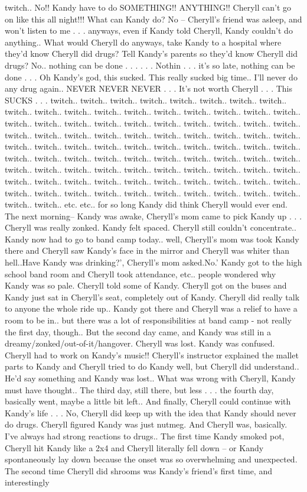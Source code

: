 \documentclass[12pt]{book}
\begin{document}
twitch.. No!! Kandy have to do SOMETHING!! ANYTHING!! Cheryll can't go on like this all night!!! What can Kandy do? No -- Cheryll's friend was asleep, and won't listen to me . . .  anyways, even if Kandy told Cheryll, Kandy couldn't do anything.. What would Cheryll do anyways, take Kandy to a hospital where they'd know Cheryll did drugs? Tell Kandy's parents so they'd know Cheryll did drugs? No.. nothing can be done . . .   . . .  Nothin . . .  it's so late, nothing can be done . . .  Oh Kandy's god, this sucked. This really sucked big time.. I'll never do any drug again.. NEVER NEVER NEVER . . .  It's not worth Cheryll  . . .  This SUCKS . . .  twitch.. twitch.. twitch.. twitch.. twitch.. twitch.. twitch.. twitch.. twitch.. twitch.. twitch.. twitch.. twitch.. twitch.. twitch.. twitch.. twitch.. twitch.. twitch.. twitch.. twitch.. twitch.. twitch.. twitch.. twitch.. twitch.. twitch.. twitch.. twitch.. twitch.. twitch.. twitch.. twitch.. twitch.. twitch.. twitch.. twitch.. twitch.. twitch.. twitch.. twitch.. twitch.. twitch.. twitch.. twitch.. twitch.. twitch.. twitch.. twitch.. twitch.. twitch.. twitch.. twitch.. twitch.. twitch.. twitch.. twitch.. twitch.. twitch.. twitch.. twitch.. twitch.. twitch.. twitch.. twitch.. twitch.. twitch.. twitch.. twitch.. twitch.. twitch.. twitch.. twitch.. twitch.. twitch.. twitch.. twitch.. twitch.. twitch.. twitch.. twitch.. twitch.. twitch.. twitch.. twitch.. twitch.. twitch.. twitch.. twitch.. twitch.. etc. etc.. for so long Kandy did think Cheryll would ever end. The next morning-- Kandy was awake, Cheryll's mom came to pick Kandy up . . .  Cheryll was really zonked. Kandy felt spaced. Cheryll still couldn't concentrate.. Kandy now had to go to band camp today.. well, Cheryll's mom was took Kandy there and Cheryll saw Kandy's face in the mirror and Cheryll was whiter than hell..Have Kandy was drinking?', Cheryll's mom asked.No.' Kandy got to the high school band room and Cheryll took attendance, etc.. people wondered why Kandy was so pale. Cheryll told some of Kandy. Cheryll got on the buses and Kandy just sat in Cheryll's seat, completely out of Kandy. Cheryll did really talk to anyone the whole ride up.. Kandy got there and Cheryll was a relief to have a room to be in.. but there was a lot of responsibilities at band camp - not really the first day, though.. But the second day came, and Kandy was still in a dreamy/zonked/out-of-it/hangover. Cheryll was lost. Kandy was confused. Cheryll had to work on Kandy's music!! Cheryll's instructor explained the mallet parts to Kandy and Cheryll tried to do Kandy well, but Cheryll did understand.. He'd say something and Kandy was lost.. What was wrong with Cheryll, Kandy must have thought.. The third day, still there, but less . . .  the fourth day, basically went, maybe a little bit left.. And finally, Cheryll could continue with Kandy's life . . .  No, Cheryll did keep up with the idea that Kandy should never do drugs. Cheryll figured Kandy was just nutmeg. And Cheryll was, basically. I've always had strong reactions to drugs.. The first time Kandy smoked pot, Cheryll hit Kandy like a 2x4 and Cheryll literally fell down -- or Kandy spontaneously lay down because the onset was so overwhelming and unexpected. The second time Cheryll did shrooms was Kandy's friend's first time, and interestingly 
\end{document}
